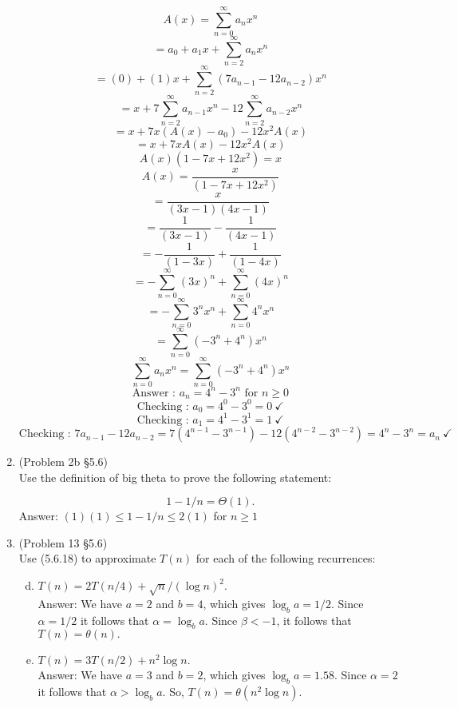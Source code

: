 \documentclass[12pt]{article}
\begin{document}
\begin{enumerate}
\[A(x)=\sum\limits_{n=0}^{\infty}a_nx^n\]
\[=a_0+a_1x+\sum\limits_{n=2}^{\infty}a_nx^n\]
\[=(0)+(1)x+\sum\limits_{n=2}^{\infty}(7a_{n-1}-12a_{n-2})x^n\]
\[=x+7\sum\limits_{n=2}^{\infty}a_{n-1}x^n-12\sum\limits_{n=2}^{\infty}a_{n-2}x^n\]
\[=x+7x(A(x)-a_0)-12x^2A(x)\]
\[=x+7xA(x)-12x^2A(x)\]
\[A(x)(1-7x+12x^2)=x\]
\[A(x)=\frac{x}{(1-7x+12x^2)}\]
\[=\frac{x}{(3x-1)(4x-1)}\]
\[=\frac{1}{(3x-1)}-\frac{1}{(4x-1)}\]
\[=-\frac{1}{(1-3x)}+\frac{1}{(1-4x)}\]
\[=-\sum\limits_{n=0}^{\infty}(3x)^n + \sum\limits_{n=0}^{\infty}(4x)^n\]
\[=-\sum\limits_{n=0}^{\infty}3^nx^n + \sum\limits_{n=0}^{\infty}4^nx^n\]
\[=\sum\limits_{n=0}^{\infty}(-3^n+4^n)x^n\]
\[\sum\limits_{n=0}^{\infty}a_nx^n= \sum\limits_{n=0}^{\infty}(-3^n+4^n)x^n\]
\[\text{Answer : }a_n=4^n-3^n \text{ for } n\geq 0\]
\[\text{Checking : }a_0=4^0-3^0=0 \ \checkmark\]
\[\text{Checking : } a_1=4^1-3^1=1 \ \checkmark\]
\[\text{Checking : } 7a_{n-1}-12a_{n-2}=7(4^{n-1}-3^{n-1})-12(4^{n-2}-3^{n-2})=4^n-3^n=a_n \ \checkmark\]







\item (Problem 2b \S 5.6)\\
Use the definition of big theta to prove the following statement:

\[1-1/n=\Theta(1).\]
Answer: $(1)(1)\leq 1-1/n\leq 2(1)$ for $n \geq 1$ 




\item (Problem 13 \S 5.6)\\
Use (5.6.18) to approximate $T(n)$ for each of the following recurrences:
\begin{enumerate}[a.]
\setcounter{enumii}{3}
\item $T(n)=2T(n/4)+\sqrt{n}/(\log n)^2.$ \\
Answer: We have $a=2$ and $b=4$, which gives $\log_ba = 1/2$. Since $\alpha = 1/2$ it follows that $\alpha = \log_ba$. Since $\beta< -1$, it follows that $T(n)=\theta(n).$

\setcounter{enumii}{5}
\item $T(n)=3T(n/2)+n^2\log n.$ \\
Answer: We have $a=3$ and $b=2$, which gives $\log_ba = 1.58$. Since $\alpha = 2$ it follows that $\alpha > \log_ba$. So, $T(n) = \theta(n^2\log n)$. 


\end{enumerate}
\end{enumerate}
\end{document}

